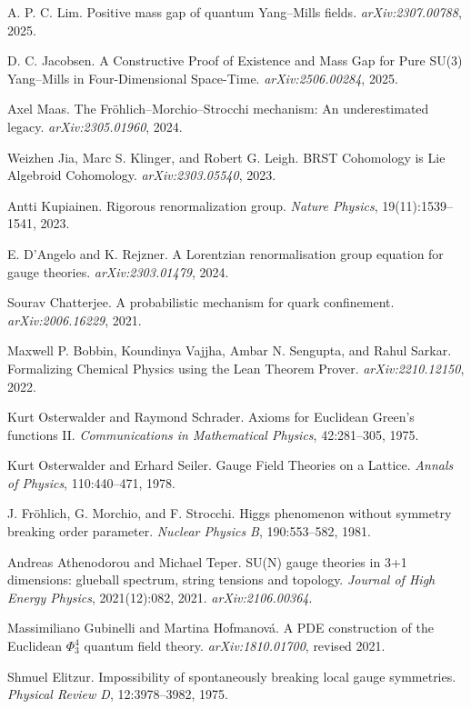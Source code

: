 \documentclass[11pt]{amsart}
\theoremstyle{plain}
\theoremstyle{definition}
\theoremstyle{remark}
\begin{document}
\begin{thebibliography}{99}
A. P. C. Lim.
Positive mass gap of quantum Yang--Mills fields.
\emph{arXiv:2307.00788}, 2025.

D. C. Jacobsen.
A Constructive Proof of Existence and Mass Gap for Pure SU(3) Yang--Mills in Four-Dimensional Space-Time.
\emph{arXiv:2506.00284}, 2025.

Axel Maas.
The Fröhlich--Morchio--Strocchi mechanism: An underestimated legacy.
\emph{arXiv:2305.01960}, 2024.

Weizhen Jia, Marc S. Klinger, and Robert G. Leigh.
BRST Cohomology is Lie Algebroid Cohomology.
\emph{arXiv:2303.05540}, 2023.

Antti Kupiainen.
Rigorous renormalization group.
\emph{Nature Physics}, 19(11):1539--1541, 2023.

E. D'Angelo and K. Rejzner.
A Lorentzian renormalisation group equation for gauge theories.
\emph{arXiv:2303.01479}, 2024.

Sourav Chatterjee.
A probabilistic mechanism for quark confinement.
\emph{arXiv:2006.16229}, 2021.

Maxwell P. Bobbin, Koundinya Vajjha, Ambar N. Sengupta, and Rahul Sarkar.
Formalizing Chemical Physics using the Lean Theorem Prover.
\emph{arXiv:2210.12150}, 2022.

Kurt Osterwalder and Raymond Schrader.
Axioms for Euclidean Green's functions II.
\emph{Communications in Mathematical Physics}, 42:281--305, 1975.

Kurt Osterwalder and Erhard Seiler.
Gauge Field Theories on a Lattice.
\emph{Annals of Physics}, 110:440--471, 1978.

J. Fröhlich, G. Morchio, and F. Strocchi.
Higgs phenomenon without symmetry breaking order parameter.
\emph{Nuclear Physics B}, 190:553--582, 1981.

Andreas Athenodorou and Michael Teper.
SU(N) gauge theories in 3+1 dimensions: glueball spectrum, string tensions and topology.
\emph{Journal of High Energy Physics}, 2021(12):082, 2021. \emph{arXiv:2106.00364}.

Massimiliano Gubinelli and Martina Hofmanová.
A PDE construction of the Euclidean $\Phi^4_3$ quantum field theory.
\emph{arXiv:1810.01700}, revised 2021.

Shmuel Elitzur.
Impossibility of spontaneously breaking local gauge symmetries.
\emph{Physical Review D}, 12:3978--3982, 1975.


\end{thebibliography}
\end{document}
